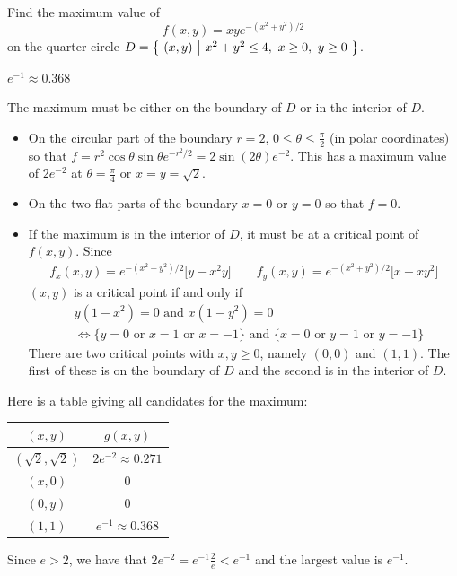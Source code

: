 \begin{question}[M200 2000A] %
Find the maximum value of 
\begin{equation*}
f(x, y) = xye^{-(x^2 + y^2) / 2}
\end{equation*}
on the quarter-circle $D = \big\{ \ (x, y)\ \big|\  x^2 + y^2 \le 4,\ x\ge0,\ y\ge 0\ \big\}$.
\end{question}

%

\begin{answer}
$e^{-1}\approx0.368$
\end{answer}

\begin{solution}
The maximum must be either on the boundary of $D$ or in the interior of $D$.
\begin{itemize} 
\item On the circular part of the boundary $r=2$, 
      $0\le\theta\le\frac{\pi}{2}$ (in polar coordinates) so that 
$f=r^2\cos\theta\sin\theta e^{-r^2/2}=2\sin(2\theta)e^{-2}$. This has a maximum value 
of $2e^{-2}$ at $\theta=\frac{\pi}{4}$ or $x=y=\sqrt{2}$.
\item 
On the two flat parts of the boundary $x=0$ or $y=0$ so that $f=0$.  
\item
 If the maximum is in the interior of $D$,
it must be at a critical point of $f(x,y)$. Since
\begin{align*}
f_x(x,y)=e^{-(x^2 + y^2) / 2}\big[y-x^2y\big]\qquad
f_y(x,y)=e^{-(x^2 + y^2) / 2}\big[x-xy^2\big]
\end{align*}
$(x,y)$ is a critical point if and only if
\begin{align*}
&y(1-x^2)=0\text{ and }x(1-y^2)=0 \\
&\iff \{y=0\text{ or }x=1\text{ or }x=-1\}\text{ and }
       \{x=0\text{ or }y=1\text{ or }y=-1\}
\end{align*}
There are two critical points with $x,y\ge 0$, namely $(0,0)$ and $(1,1)$. 
The first of these is on the boundary of $D$ and the second is in the 
interior of $D$.
\end{itemize}
Here is a table giving all candidates for the maximum:
\begin{center}
\renewcommand{\arraystretch}{1.3}
     \begin{tabular}{|c|c|}
     \hline
       $(x,y)$  & $g(x,y)$ \\ \hline
       $(\sqrt{2},\sqrt{2})$ & $2e^{-2}\approx0.271$ \\ \hline
       $(x,0)$ & $0$ \\ \hline
       $(0,y)$ & $0$ \\ \hline
       $(1,1)$ & $e^{-1}\approx0.368$ \\ \hline
     \end{tabular}
\renewcommand{\arraystretch}{1.0}
\end{center}
Since $e>2$, we have that $2e^{-2}=e^{-1}\frac{2}{e}<e^{-1}$ and
the largest value is $e^{-1}$.
\end{solution}


